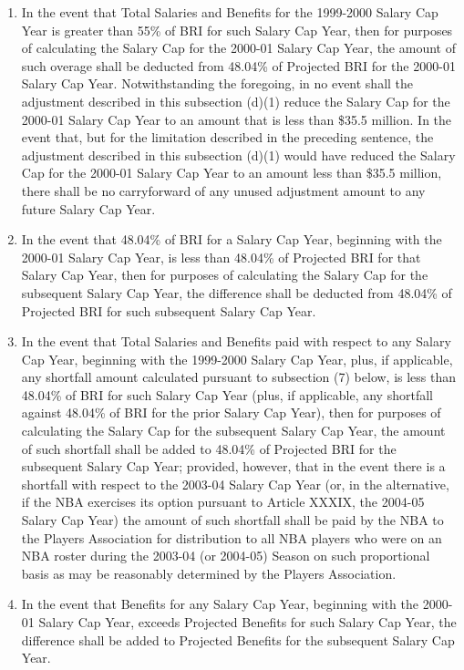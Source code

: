 \documentclass[
]{book}
\providecommand{\tightlist}{%
  \setlength{\itemsep}{0pt}\setlength{\parskip}{0pt}}
\begin{document}
\begin{enumerate}
  \begin{enumerate}
  \def\labelenumii{(\arabic{enumii})}
  \tightlist
  \item
    In the event that Total Salaries and Benefits for the 1999-2000 Salary Cap Year is greater than 55\% of BRI for such Salary Cap Year, then for purposes of calculating the Salary Cap for the 2000-01 Salary Cap Year, the amount of such overage shall be deducted from 48.04\% of Projected BRI for the 2000-01 Salary Cap Year. Notwithstanding the foregoing, in no event shall the adjustment described in this subsection (d)(1) reduce the Salary Cap for the 2000-01 Salary Cap Year to an amount that is less than \$35.5 million. In the event that, but for the limitation described in the preceding sentence, the adjustment described in this subsection (d)(1) would have reduced the Salary Cap for the 2000-01 Salary Cap Year to an amount less than \$35.5 million, there shall be no carryforward of any unused adjustment amount to any future Salary Cap Year.
  \item
    In the event that 48.04\% of BRI for a Salary Cap Year, beginning with the 2000-01 Salary Cap Year, is less than 48.04\% of Projected BRI for that Salary Cap Year, then for purposes of calculating the Salary Cap for the subsequent Salary Cap Year, the difference shall be deducted from 48.04\% of Projected BRI for such subsequent Salary Cap Year.
  \item
    In the event that Total Salaries and Benefits paid with respect to any Salary Cap Year, beginning with the 1999-2000 Salary Cap Year, plus, if applicable, any shortfall amount calculated pursuant to subsection (7) below, is less than 48.04\% of BRI for such Salary Cap Year (plus, if applicable, any shortfall against 48.04\% of BRI for the prior Salary Cap Year), then for purposes of calculating the Salary Cap for the subsequent Salary Cap Year, the amount of such shortfall shall be added to 48.04\% of Projected BRI for the subsequent Salary Cap Year; provided, however, that in the event there is a shortfall with respect to the 2003-04 Salary Cap Year (or, in the alternative, if the NBA exercises its option pursuant to Article XXXIX, the 2004-05 Salary Cap Year) the amount of such shortfall shall be paid by the NBA to the Players Association for distribution to all NBA players who were on an NBA roster during the 2003-04 (or 2004-05) Season on such proportional basis as may be reasonably determined by the Players Association.
  \item
    In the event that Benefits for any Salary Cap Year, beginning with the 2000-01 Salary Cap Year, exceeds Projected Benefits for such Salary Cap Year, the difference shall be added to Projected Benefits for the subsequent Salary Cap Year.

\end{enumerate}
\end{enumerate}
\end{document}
